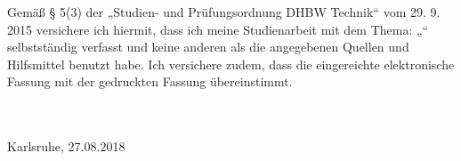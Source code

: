 Gemäß § 5(3) der „Studien- und Prüfungsordnung DHBW Technik“ vom 29. 9. 2015 versichere ich hiermit, dass ich meine Studienarbeit mit dem Thema: „\Titel“ selbstständig verfasst und keine anderen als die angegebenen Quellen und Hilfsmittel benutzt habe. Ich versichere zudem, dass die eingereichte elektronische Fassung mit der gedruckten Fassung übereinstimmt.


\vspace{3cm}
\noindent
\underline{\hspace{10cm}}\\\\
Karlsruhe, 27.08.2018\hspace{4cm}\\\\\\
